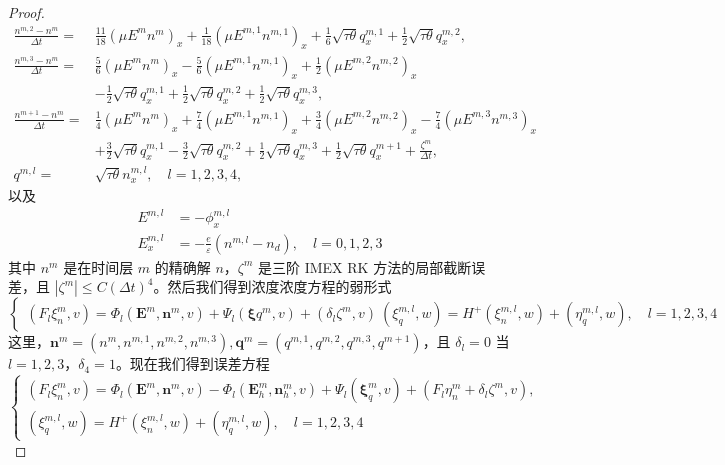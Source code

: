 \begin{proof}
\begin{equation}
\begin{split}
            \frac{n^{m,2} - n^m}{\Delta t} = & \frac{11}{18} (\mu E^m n^m)_x + \frac{1}{18} (\mu E^{m,1} n^{m,1})_x + \frac{1}{6} \sqrt{\tau \theta} q_x^{m,1} + \frac{1}{2} \sqrt{\tau \theta} q_x^{m,2}, \\
            \frac{n^{m,3} - n^m}{\Delta t} = & \frac{5}{6} (\mu E^m n^m)_x - \frac{5}{6} (\mu E^{m,1} n^{m,1})_x + \frac{1}{2} (\mu E^{m,2} n^{m,2})_x \\
            & -\frac{1}{2} \sqrt{\tau \theta} q_x^{m,1} + \frac{1}{2} \sqrt{\tau \theta} q_x^{m,2} + \frac{1}{2} \sqrt{\tau \theta} q_x^{m,3}, \\
            \frac{n^{m+1} - n^m}{\Delta t} = & \frac{1}{4} (\mu E^m n^m)_x + \frac{7}{4} (\mu E^{m,1} n^{m,1})_x + \frac{3}{4} (\mu E^{m,2} n^{m,2})_x - \frac{7}{4} (\mu E^{m,3} n^{m,3})_x \\
            & +\frac{3}{2} \sqrt{\tau \theta} q_x^{m,1} - \frac{3}{2} \sqrt{\tau \theta} q_x^{m,2} + \frac{1}{2} \sqrt{\tau \theta} q_x^{m,3} + \frac{1}{2} \sqrt{\tau \theta} q_x^{m+1} + \frac{\zeta^m}{\Delta t}, \\
            q^{m,l} = & \sqrt{\tau \theta} n_x^{m,l}, \quad l=1,2,3,4,
        \end{split}
    \end{equation}
    以及
    \begin{equation}
        \begin{split}
            E^{m,l} & = -\phi_x^{m,l} \\
            E_x^{m,l} & = -\frac{e}{\varepsilon} (n^{m,l} - n_d), \quad l=0,1,2,3
        \end{split}
    \end{equation}
    其中 $n^m$ 是在时间层 $m$ 的精确解 $n$，$\zeta^m$ 是三阶 IMEX RK 方法的局部截断误差，且 $|\zeta^m| \leq C(\Delta t)^4$。然后我们得到浓度浓度方程的弱形式
    $$
        \left\{\begin{array}{l}
            (F_l \xi_n^m, v) = \Phi_l (\boldsymbol{E}^m, \boldsymbol{n}^m, v) + \Psi_l (\boldsymbol{\xi}q^m, v) + (\delta_l \zeta^m, v) \ (\xi_q^{m,l}, w) = H^+ (\xi_n^{m,l}, w) + (\eta_q^{m,l}, w), \quad l=1,2,3,4
        \end{array}\right.
    $$
    这里，$\boldsymbol{n}^m = (n^m, n^{m,1}, n^{m,2}, n^{m,3}), \boldsymbol{q}^m = (q^{m,1}, q^{m,2}, q^{m,3}, q^{m+1})$，且 $\delta_l = 0$ 当 $l=1,2,3$，$\delta_4 = 1$。现在我们得到误差方程
    $$
        \left\{\begin{array}{l}
            \left(F_{l} \xi_{n}^{m}, v\right)=\Phi_{l}\left(\boldsymbol{E}^{m}, \boldsymbol{n}^{m}, v\right)-\Phi_{l}\left(\boldsymbol{E}_{h}^{m}, \boldsymbol{n}_{h}^{m}, v\right)+\Psi_{l}\left(\boldsymbol{\xi}_{q}^{m}, v\right)+\left(F_{l} \eta_{n}^{m}+\delta_{l} \zeta^{m}, v\right), \\
            \left(\xi_{q}^{m, l}, w\right)=H^{+}\left(\xi_{n}^{m, l}, w\right)+\left(\eta_{q}^{m, l}, w\right), \quad l=1,2,3,4
        \end{array}\right.
    $$


\end{proof}
